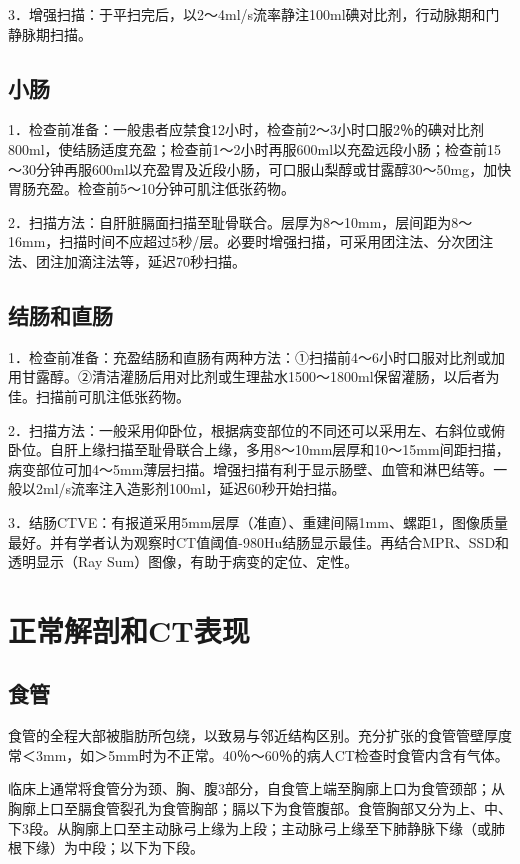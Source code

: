 3．增强扫描：于平扫完后，以2～4ml/s流率静注100ml碘对比剂，行动脉期和门静脉期扫描。

\subsection{小肠}

1．检查前准备：一般患者应禁食12小时，检查前2～3小时口服2％的碘对比剂800ml，使结肠适度充盈；检查前1～2小时再服600ml以充盈远段小肠；检查前15～30分钟再服600ml以充盈胃及近段小肠，可口服山梨醇或甘露醇30～50mg，加快胃肠充盈。检查前5～10分钟可肌注低张药物。

2．扫描方法：自肝脏膈面扫描至耻骨联合。层厚为8～10mm，层间距为8～16mm，扫描时间不应超过5秒/层。必要时增强扫描，可采用团注法、分次团注法、团注加滴注法等，延迟70秒扫描。

\subsection{结肠和直肠}

1．检查前准备：充盈结肠和直肠有两种方法：①扫描前4～6小时口服对比剂或加用甘露醇。②清洁灌肠后用对比剂或生理盐水1500～1800ml保留灌肠，以后者为佳。扫描前可肌注低张药物。

2．扫描方法：一般采用仰卧位，根据病变部位的不同还可以采用左、右斜位或俯卧位。自肝上缘扫描至耻骨联合上缘，多用8～10mm层厚和10～15mm间距扫描，病变部位可加4～5mm薄层扫描。增强扫描有利于显示肠壁、血管和淋巴结等。一般以2ml/s流率注入造影剂100ml，延迟60秒开始扫描。

3．结肠CTVE：有报道采用5mm层厚（准直）、重建间隔1mm、螺距1，图像质量最好。并有学者认为观察时CT值阈值-980Hu结肠显示最佳。再结合MPR、SSD和透明显示（Ray
Sum）图像，有助于病变的定位、定性。

\section{正常解剖和CT表现}

\subsection{食管}

食管的全程大部被脂肪所包绕，以致易与邻近结构区别。充分扩张的食管管壁厚度常＜3mm，如＞5mm时为不正常。40％～60％的病人CT检查时食管内含有气体。

临床上通常将食管分为颈、胸、腹3部分，自食管上端至胸廓上口为食管颈部；从胸廓上口至膈食管裂孔为食管胸部；膈以下为食管腹部。食管胸部又分为上、中、下3段。从胸廓上口至主动脉弓上缘为上段；主动脉弓上缘至下肺静脉下缘（或肺根下缘）为中段；以下为下段。

